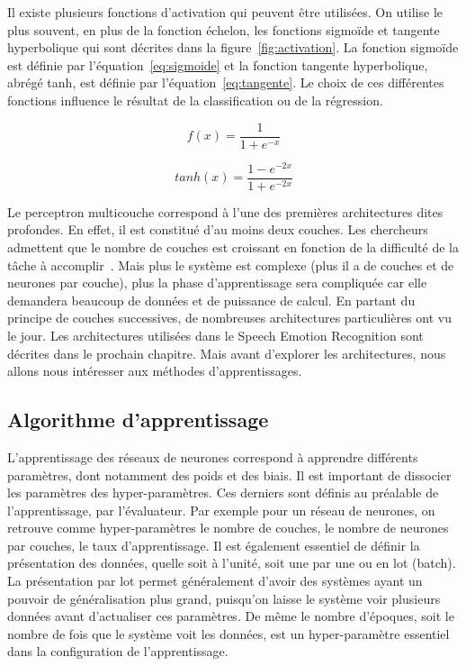 

Il existe plusieurs fonctions d'activation qui peuvent être utilisées. On utilise le plus souvent, en plus de la fonction échelon, les fonctions sigmoïde et tangente hyperbolique qui sont décrites dans la figure~\ref{fig:activation}. La fonction sigmoïde est définie par l'équation~\ref{eq:sigmoide} et la fonction tangente hyperbolique, abrégé tanh, est définie par l'équation~\ref{eq:tangente}. Le choix de ces différentes fonctions influence le résultat de la classification ou de la régression.

\begin{equation}
  f(x) = \frac{1}{1+ e^{-x}}
  \label{eq:sigmoide}
\end{equation}

\begin{equation}
  tanh(x) = \frac{1-e^{-2x}}{1+e^{-2x}}
  \label{eq:tangente}
\end{equation}

Le perceptron multicouche correspond à l'une des premières architectures dites profondes. En effet, il est constitué d'au moins deux couches. Les chercheurs admettent que le nombre de couches est croissant en fonction de la difficulté de la tâche à accomplir~\cite{Goodfellow2016}. Mais plus le système est complexe (plus il a de couches et de neurones par couche), plus la phase d'apprentissage sera compliquée car elle demandera beaucoup de données et de puissance de calcul.
En partant du principe de couches successives, de nombreuses architectures particulières ont vu le jour. Les architectures utilisées dans le Speech Emotion Recognition sont décrites dans le prochain chapitre. Mais avant d'explorer les architectures, nous allons nous intéresser aux méthodes d'apprentissages.

\subsection{Algorithme d'apprentissage}
L'apprentissage des réseaux de neurones correspond à apprendre différents paramètres, dont notamment des poids et des biais. Il est important de dissocier les paramètres des hyper-paramètres. Ces derniers sont définis au préalable de l'apprentissage, par l'évaluateur. Par exemple pour un réseau de neurones, on retrouve comme hyper-paramètres le nombre de couches, le nombre de neurones par couches, le taux d'apprentissage. Il est également essentiel de définir la présentation des données, quelle soit à l'unité, soit une par une ou en lot (batch). La présentation par lot permet généralement d'avoir des systèmes ayant un pouvoir de généralisation plus grand, puisqu'on laisse le système voir plusieurs données avant d'actualiser ces paramètres. De même le nombre d'époques, soit le nombre de fois que le système voit les données, est un hyper-paramètre essentiel dans la configuration de l'apprentissage.

